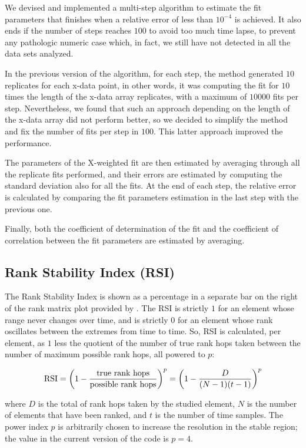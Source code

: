 We devised and implemented a multi-step algorithm to estimate the fit parameters that finishes when a relative error of less than $10^{-4}$ is achieved. It also ends if the number of steps reaches $100$ to avoid too much time lapse, to prevent any pathologic numeric case which, in fact, we still have not detected in all the data sets analyzed.

In the previous version of the algorithm, for each step, the method generated $10$ replicates for each x-data point, in other words, it was computing the fit for $10$ times the length of the x-data array replicates, with a maximum of $10000$ fits per step. Nevertheless, we found that such an approach depending on the length of the x-data array did not perform better, so we decided to simplify the method and fix the number of fits per step in $100$. This latter approach improved the performance. 

The parameters of the X-weighted fit are then estimated by averaging through all the replicate fits performed, and their errors are estimated by computing the standard deviation also for all the fits. At the end of each step, the relative error is calculated by comparing the fit parameters estimation in the last step with the previous one.

Finally, both the coefficient of determination of the fit and the coefficient of correlation between the fit parameters are estimated by averaging.

\subsection*{Rank Stability Index (RSI)}\label{sec:RSI}

The Rank Stability Index is shown as a percentage in a separate bar on the right of the rank matrix plot provided by \CC. The RSI is strictly $1$ for an element whose range never changes over time, and is strictly $0$ for an element whose rank oscillates between the extremes from time to time. So, RSI is calculated, per element, as $1$ less the quotient of the number of true rank hops taken between the number of maximum possible rank hops, all powered to $p$:
\begin{linenomath}
$${\rm RSI} = \left(1-\frac{\text{true rank hops}}{\text{possible rank hops}}\right)^p = \left(1-\frac{D}{(N-1)(t-1)}\right)^p$$
\end{linenomath}
where $D$ is the total of rank hops taken by the studied element, $N$ is the number of elements that have been ranked, and $t$ is the number of time samples. The power index $p$ is arbitrarily chosen to increase the resolution in the stable region; the value in the current version of the code is $p=4$. 

